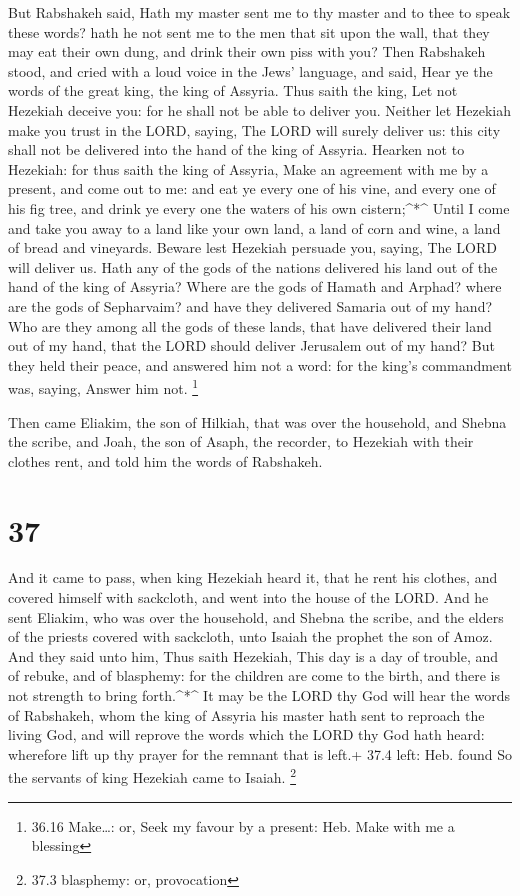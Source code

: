  But Rabshakeh said, Hath my master sent me to thy master
and to thee to speak these words? hath he not sent me to the men that
sit upon the wall, that they may eat their own dung, and drink their own
piss with you?  Then Rabshakeh stood, and cried with a loud
voice in the Jews' language, and said, Hear ye the words of the great
king, the king of Assyria.  Thus saith the king, Let not
Hezekiah deceive you: for he shall not be able to deliver you.
 Neither let Hezekiah make you trust in the LORD, saying,
The LORD will surely deliver us: this city shall not be delivered into
the hand of the king of Assyria.  Hearken not to Hezekiah:
for thus saith the king of Assyria, Make an agreement with me by a
present, and come out to me: and eat ye every one of his vine, and every
one of his fig tree, and drink ye every one the waters of his own
cistern;\^{}*\^{}  Until I come and take you away to a land
like your own land, a land of corn and wine, a land of bread and
vineyards.  Beware lest Hezekiah persuade you, saying, The
LORD will deliver us. Hath any of the gods of the nations delivered his
land out of the hand of the king of Assyria?  Where are the
gods of Hamath and Arphad? where are the gods of Sepharvaim? and have
they delivered Samaria out of my hand?  Who are they among
all the gods of these lands, that have delivered their land out of my
hand, that the LORD should deliver Jerusalem out of my hand?
 But they held their peace, and answered him not a word:
for the king's commandment was, saying, Answer him not. \footnote{36.16
  Make\ldots: or, Seek my favour by a present: Heb. Make with me a
  blessing}

 Then came Eliakim, the son of Hilkiah, that was over the
household, and Shebna the scribe, and Joah, the son of Asaph, the
recorder, to Hezekiah with their clothes rent, and told him the words of
Rabshakeh.

\hypertarget{section-36}{%
\section{37}\label{section-36}}

 And it came to pass, when king Hezekiah heard it, that he
rent his clothes, and covered himself with sackcloth, and went into the
house of the LORD.  And he sent Eliakim, who was over the
household, and Shebna the scribe, and the elders of the priests covered
with sackcloth, unto Isaiah the prophet the son of Amoz. 
And they said unto him, Thus saith Hezekiah, This day is a day of
trouble, and of rebuke, and of blasphemy: for the children are come to
the birth, and there is not strength to bring forth.\^{}*\^{}
 It may be the LORD thy God will hear the words of
Rabshakeh, whom the king of Assyria his master hath sent to reproach the
living God, and will reprove the words which the LORD thy God hath
heard: wherefore lift up thy prayer for the remnant that is left.+ 37.4
left: Heb. found  So the servants of king Hezekiah came to
Isaiah. \footnote{37.3 blasphemy: or, provocation}

